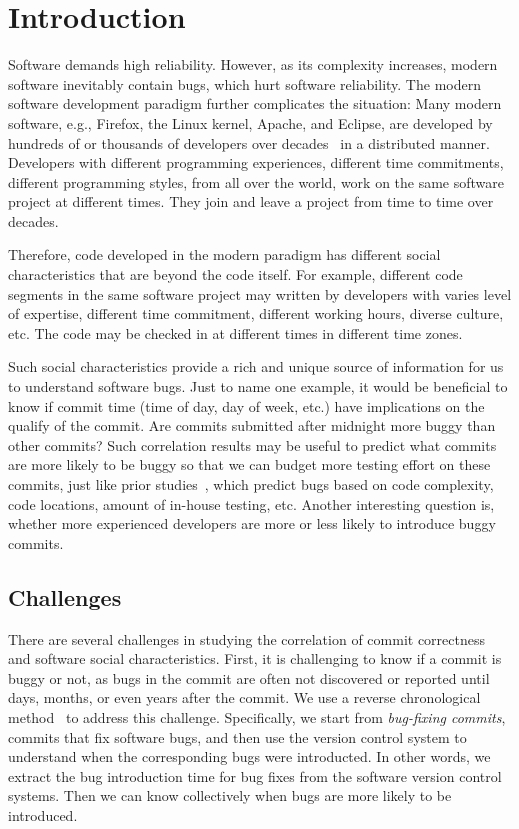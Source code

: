 \section{Introduction}


Software demands high reliability. However, as its complexity increases, 
modern software inevitably contain bugs, which hurt software reliability.
The modern software development paradigm further complicates the situation: 
Many modern software, e.g., Firefox, the Linux kernel, Apache, and Eclipse, 
are developed by hundreds of or thousands of developers over decades~\cite{ccomment} 
in a distributed manner. Developers with different programming experiences, 
different time commitments, different programming styles, from all over the world,
work on the same software project at different times. They join and leave a project 
from time to time over decades. 

Therefore, code developed in the modern paradigm has different social characteristics 
that are beyond the code itself. For example, different code segments in the same
software project may written by developers with  
varies level of expertise, different time 
commitment, different working hours, diverse culture, etc.
The code may be checked in at different times in different time zones. 

Such social characteristics provide a rich and unique source of information for us to 
understand software bugs. Just to name one example, it would be beneficial to know if  
commit time (time of day, day of week, etc.) have implications on the qualify of the commit. 
Are commits submitted after midnight more buggy than other commits? 
Such correlation results may be useful to predict what commits are more likely
to be buggy so that we can budget more testing effort on these commits, just
like prior studies~\cite{graves00predicting, guo04robust, ostrand05predicting},
which predict bugs based on code complexity, 
code locations, amount of in-house testing, etc. 
Another interesting question is, whether more experienced developers are more or less
likely to introduce buggy commits. 


\subsection{Challenges}
There are several challenges in studying the correlation of commit correctness and software social characteristics.
First, it is challenging to know if a commit is buggy or not,
as bugs in the commit are often not 
discovered or reported until days, months, or even years after the commit. 
We use a reverse chronological method~\cite{2005-changes} to address this challenge. 
Specifically, we start from {\em bug-fixing commits}, commits that fix software bugs, 
and then use the version control system to understand when the corresponding bugs were introducted. 
In other words, we extract the bug introduction time for bug fixes 
from the software version control systems. Then we can know 
collectively when bugs are more likely to be introduced. 

